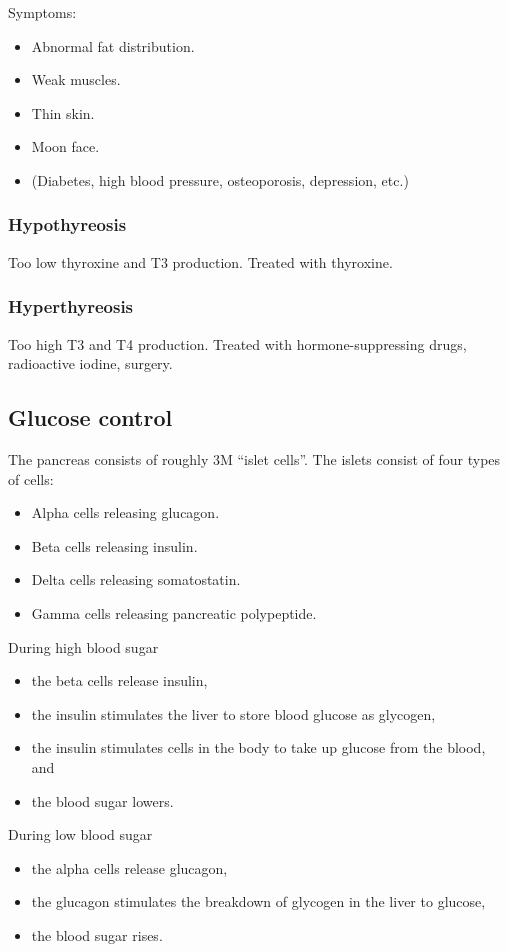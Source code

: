 Symptoms:
\begin{itemize}
  \item Abnormal fat distribution.
  \item Weak muscles.
  \item Thin skin.
  \item Moon face.
  \item (Diabetes, high blood pressure, osteoporosis, depression, etc.)
\end{itemize}

\subsubsection{Hypothyreosis}
Too low thyroxine and T3 production. Treated with thyroxine.

\subsubsection{Hyperthyreosis}
Too high T3 and T4 production. Treated with hormone-suppressing drugs, radioactive iodine, surgery.

\subsection{Glucose control}
The pancreas consists of roughly 3M ``islet cells''. The islets consist of four types of cells:
\begin{itemize}
  \item Alpha cells releasing glucagon.
  \item Beta cells releasing insulin.
  \item Delta cells releasing somatostatin.
  \item Gamma cells releasing pancreatic polypeptide.
\end{itemize}

During high blood sugar
\begin{itemize}
  \item the beta cells release insulin,
  \item the insulin stimulates the liver to store blood glucose as glycogen,
  \item the insulin stimulates cells in the body to take up glucose from the blood, and
  \item the blood sugar lowers.
\end{itemize}
During low blood sugar
\begin{itemize}
  \item the alpha cells release glucagon,
  \item the glucagon stimulates the breakdown of glycogen in the liver to glucose,
  \item the blood sugar rises.
\end{itemize}

